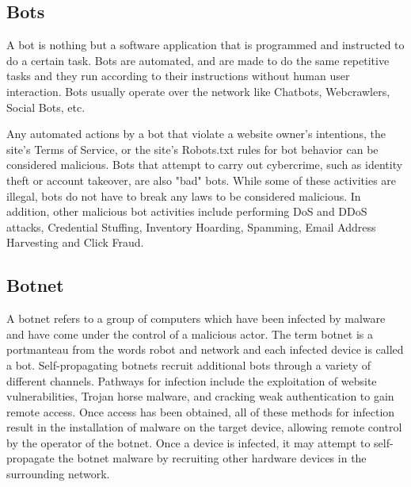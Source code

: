 \documentclass[a4paper, 12pt]{article}
\begin{document}
\subsection{Bots}
\par
\hspace{0.5cm}
A bot is nothing but a software application that is programmed and instructed to do a certain task. Bots are automated, and are made to do the same repetitive tasks and they run according to their instructions without human user interaction. Bots usually operate over the network like Chatbots, Webcrawlers, Social Bots, etc.
\par
Any automated actions by a bot that violate a website owner's intentions, the site's Terms of Service, or the site's Robots.txt rules for bot behavior can be considered malicious. Bots that attempt to carry out cybercrime, such as identity theft or account takeover, are also "bad" bots. While some of these activities are illegal, bots do not have to break any laws to be considered malicious. In addition, other malicious bot activities include performing DoS and DDoS attacks, Credential Stuffing, Inventory Hoarding, Spamming, Email Address Harvesting and Click Fraud.
\\
\subsection{Botnet}
\par 
\hspace{0.5cm}
A botnet refers to a group of computers which have been infected by malware and have come under the control of a malicious actor. The term botnet is a portmanteau from the words robot and network and each infected device is called a bot. Self-propagating botnets recruit additional bots through a variety of different channels. Pathways for infection include the exploitation of website vulnerabilities, Trojan horse malware, and cracking weak authentication to gain remote access. Once access has been obtained, all of these methods for infection result in the installation of malware on the target device, allowing remote control by the operator of the botnet. Once a device is infected, it may attempt to self-propagate the botnet malware by recruiting other hardware devices in the surrounding network.
\end{document}
